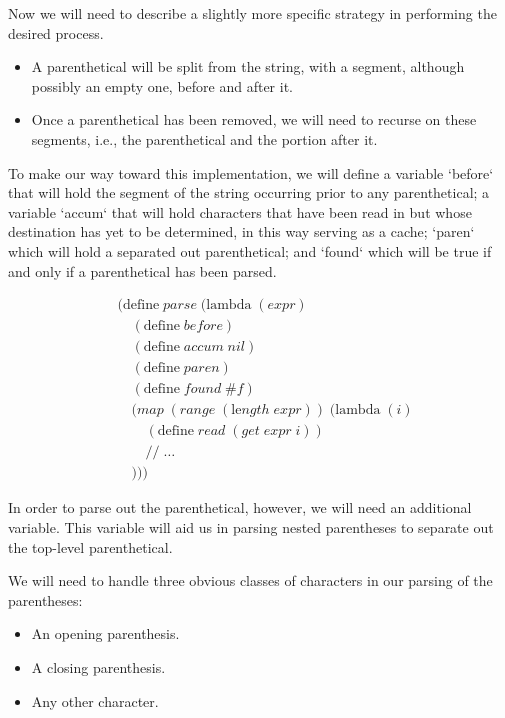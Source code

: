 Now we will need to describe a slightly more specific strategy in performing the desired 
process.

\begin{itemize}
  \item A parenthetical will be split from the string, with a segment, although possibly an empty one, before and after it.
  \item Once a parenthetical has been removed, we will need to recurse on these segments, i.e., the parenthetical and the portion after it.
\end{itemize}

To make our way toward this implementation, we will define a variable `before` that will 
hold the segment of the string occurring prior to any parenthetical; a variable `accum` 
that will hold characters that have been read in but whose destination has yet to be 
determined, in this way serving as a cache; `paren` which will hold a separated out 
parenthetical; and `found` which will be true if and only if a parenthetical has been 
parsed.

\begin{align*}
& (\text{define} \; parse \; (\text{lambda} \; (expr) \; 
\\& \quad (\text{define} \; before)
\\& \quad (\text{define} \; accum \; nil)
\\& \quad (\text{define} \; paren)
\\& \quad (\text{define} \; found \; \#f)
\\& \quad (map \; (range \; (\text{le}ngth \; expr)) \; (\text{lambda} \; (i)
\\& \qquad (\text{define} \; read \; (get \; expr \; i))
\\& \qquad // \; \dots
\\& \quad )))
\end{align*}

In order to parse out the parenthetical, however, we will need an additional variable. 
This variable will aid us in parsing nested parentheses to separate out the top-level parenthetical.

We will need to handle three obvious classes of characters in our parsing of the parentheses:

\begin{itemize}
  \item An opening parenthesis.
  \item A closing parenthesis.
  \item Any other character.
\end{itemize}

